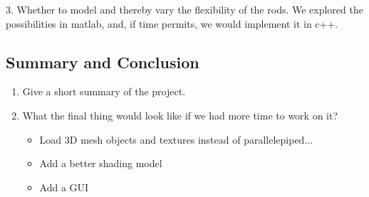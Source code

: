 \documentclass[paper=a4, fontsize=11pt]{scrartcl} %
\numberwithin{equation}{section} %
\numberwithin{figure}{section} %
\numberwithin{table}{section} %
\begin{document}
3. Whether to model and thereby vary the flexibility of the rods.
We explored the possibilities in matlab, and, if time permits, we would implement it in c++.\\



\subsection{Summary and Conclusion}

\begin{enumerate}
\item Give a short summary of the project.
\item What the final thing would look like if we had more time to work on it?

\begin{itemize}
	\item Load 3D mesh objects and textures instead of parallelepiped...
	\item Add a better shading model
	\item Add a GUI
\end{itemize}
\end{enumerate}
\nocite{Fedor2003}
\nocite{Welman1993}
{}

\end{document}

